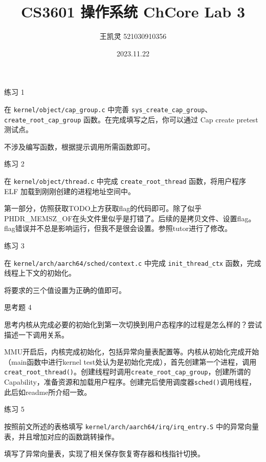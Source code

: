 \documentclass{article}
\newcommand{\customthmname}{}
\newenvironment{prob}[1]
{\renewcommand{\customthmname}{#1}%
	\fontfamily{ptm}\selectfont  %
	\par\bigskip\noindent\Large{\customthmname}\normalsize\par}
{\par\bigskip}
\begin{document}
	\title{CS3601 操作系统 ChCore Lab 3}
	\author{王凯灵 521030910356}
	\date{2023.11.22}
	\maketitle
	\begin{prob}{练习 1}
		在 \texttt{kernel/object/cap\_group.c} 中完善 \texttt{sys\_create\_cap\_group}、\texttt{create\_root\_cap\_group} 函数。在完成填写之后，你可以通过 Cap create pretest 测试点。
	\end{prob}
	不涉及编写函数，根据提示调用所需函数即可。
	
	\begin{prob}{练习 2}
		在 \texttt{kernel/object/thread.c} 中完成 \texttt{create\_root\_thread} 函数，将用户程序 ELF 加载到刚刚创建的进程地址空间中。
	\end{prob}
	第一部分，仿照获取TODO上方获取flag的代码即可。除了似乎PHDR\_MEMSZ\_OF在头文件里似乎是打错了。后续的是拷贝文件、设置flag。flag错误并不总是影响运行，但我不是很会设置。参照tutor进行了修改。
	
	\begin{prob}{练习 3}
		在 \texttt{kernel/arch/aarch64/sched/context.c} 中完成 \texttt{init\_thread\_ctx} 函数，完成线程上下文的初始化。
	\end{prob}
	将要求的三个值设置为正确的值即可。
	
	\begin{prob}{思考题 4}
		思考内核从完成必要的初始化到第一次切换到用户态程序的过程是怎么样的？尝试描述一下调用关系。
	\end{prob}
	MMU开启后，内核完成初始化，包括异常向量表配置等。内核从初始化完成开始（main函数中进行kernel test处认为是初始化完成），首先创建第一个进程，调用\texttt{creat\_root\_thread()}。创建线程时调用\texttt{create\_root\_cap\_group}，创建所谓的Capability，准备资源和加载用户程序。创建完后使用调度器\texttt{sched()}调用线程，此后如readme所介绍一致。
	
	\begin{prob}{练习 5}
		按照前文所述的表格填写 \texttt{kernel/arch/aarch64/irq/irq\_entry.S} 中的异常向量表，并且增加对应的函数跳转操作。
	\end{prob}
	填写了异常向量表，实现了相关保存恢复寄存器和栈指针切换。
	
\end{document}
